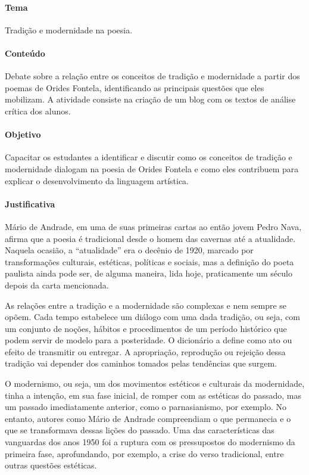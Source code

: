 \documentclass[12pt]{extarticle}
\begin{document}
\paragraph{Tema} Tradição e modernidade na poesia.

\paragraph{Conteúdo} Debate sobre a relação entre os conceitos de tradição
e modernidade a partir dos poemas de Orides Fontela, identificando as
principais questões que eles mobilizam. A atividade consiste na criação
de um blog com os textos de análise crítica dos alunos.

\paragraph{Objetivo} Capacitar os estudantes a identificar e discutir como
os conceitos de tradição e modernidade dialogam na poesia de Orides
Fontela e como eles contribuem para explicar o desenvolvimento da
linguagem artística.

\paragraph{Justificativa} Mário de Andrade, em uma de suas primeiras
cartas ao então jovem Pedro Nava, afirma que a poesia é tradicional
desde o homem das cavernas até a atualidade. Naquela ocasião, a
``atualidade'' era o decênio de 1920, marcado por transformações
culturais, estéticas, políticas e sociais, mas a definição do poeta
paulista ainda pode ser, de alguma maneira, lida hoje, praticamente um
século depois da carta mencionada.

As relações entre a tradição e a modernidade são complexas e nem sempre
se opõem. Cada tempo estabelece um diálogo com uma dada tradição, ou
seja, com um conjunto de noções, hábitos e procedimentos de um período
histórico que podem servir de modelo para a posteridade. O dicionário a
define como ato ou efeito de transmitir ou entregar. A apropriação,
reprodução ou rejeição dessa tradição vai depender dos caminhos tomados
pelas tendências que surgem.

O modernismo, ou seja, um dos movimentos estéticos e culturais da
modernidade, tinha a intenção, em sua fase inicial, de romper com as
estéticas do passado, mas um passado imediatamente anterior, como o
parnasianismo, por exemplo. No entanto, autores como Mário de Andrade
compreendiam o que permanecia e o que se transformava dessas lições do
passado. Uma das características das vanguardas dos anos 1950 foi a
ruptura com os pressupostos do modernismo da primeira fase,
aprofundando, por exemplo, a crise do verso tradicional, entre outras
questões estéticas.
\end{document}

